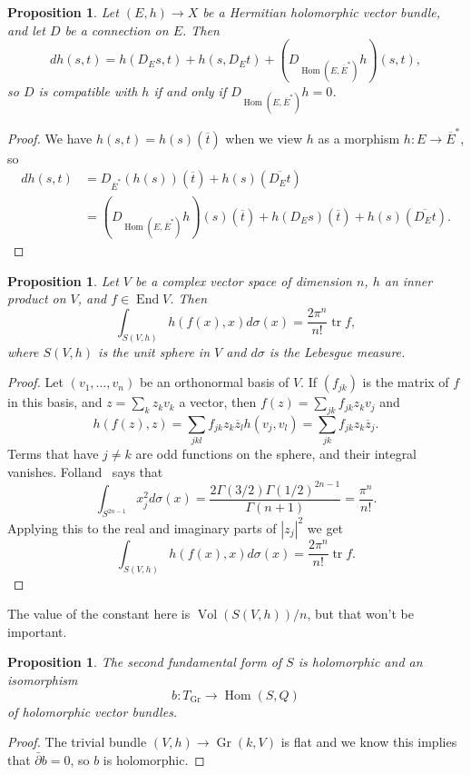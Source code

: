 \documentclass[10pt,a4paper]{article}
\newtheorem{prop}[theo]{Proposition}
\newtheorem*{proof}{Proof}
\def\ov#1{\overline{#1}}
\DeclareMathOperator{\Gr}{Gr}
\DeclareMathOperator{\Vol}{Vol}
\DeclareMathOperator{\End}{End}
\DeclareMathOperator{\Hom}{Hom}
\DeclareMathOperator{\tr}{tr}
\begin{document}
\begin{prop}
\label{prop:metric-parallel}
Let $(E,h) \to X$ be a Hermitian holomorphic vector bundle, and let $D$ be a connection on $E$. Then
\[
d h(s,t)
= h(D_Es, t) + h(s, D_Et)
+ (D_{\Hom(E,\overline E^*)}h)(s,t),
\]
so $D$ is compatible with $h$ if and only if $D_{\Hom(E,\overline E^*)}h = 0$.
\end{prop}

\begin{proof}
We have $h(s,t) = h(s)(\ov t)$ when we view $h$ as a morphism $h : E \to \ov E^*$, so
\begin{align*}
d h(s,t)
&= D_{\ov E^*}(h(s))(\ov t)
+ h(s)(\ov{D_Et})
\\
&= (D_{\Hom(E,\overline E^*)}h)(s)(\ov t)
+ h(D_E s)(\ov t)
+ h(s)(\ov{D_Et}).
\end{align*}
\end{proof}


\begin{prop}
\label{prop:trace-integral}
Let $V$ be a complex vector space of dimension $n$, $h$ an inner product on $V$, and $f \in \End V$. Then
\[
\int_{S(V,h)} h(f(x),x) d\sigma(x)
= \frac{2\pi^n}{n!} \tr f,
\]
where $S(V,h)$ is the unit sphere in $V$ and $d\sigma$ is the Lebesgue measure.
\end{prop}


\begin{proof}
Let $(v_1,\ldots,v_n)$ be an orthonormal basis of $V$. If $(f_{jk})$ is the matrix of $f$ in this basis, and $z = \sum_k z_k v_k$ a vector, then $f(z) = \sum_{jk} f_{jk} z_k v_j$ and
\[
h(f(z), z)
= \sum_{jkl} f_{jk} z_k \ov z_l h(v_j, v_l)
= \sum_{jk} f_{jk} z_k \ov z_j.
\]
Terms that have $j \not= k$ are odd functions on the sphere, and their integral vanishes. Folland~\cite{folland} says that
\[
\int_{S^{2n-1}} x_j^2 d\sigma(x)
= \frac{2\Gamma(3/2)\Gamma(1/2)^{2n-1}}{\Gamma(n+1)}
= \frac{\pi^n}{n!}.
\]
Applying this to the real and imaginary parts of $|z_j|^2$ we get
\[
\int_{S(V,h)} h(f(x),x) d\sigma(x)
= \frac{2\pi^n}{n!} \tr f.
\]
\end{proof}

The value of the constant here is $\Vol(S(V,h)) / n$, but that won't be important.


\begin{prop}
The second fundamental form of $S$ is holomorphic and an isomorphism
\[
b : T_{\Gr} \to \Hom(S,Q)
\]
of holomorphic vector bundles.
\end{prop}

\begin{proof}
The trivial bundle $(V,h) \to \Gr(k, V)$ is flat and we know this implies that $\bar\partial b = 0$, so $b$ is holomorphic.
\end{proof}
\end{document}
